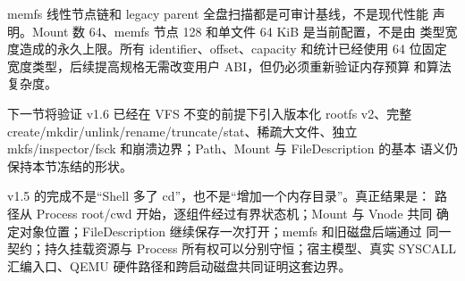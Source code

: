 memfs 线性节点链和 legacy parent 全盘扫描都是可审计基线，不是现代性能
声明。Mount 数 64、memfs 节点 128 和单文件 64 KiB 是当前配置，不是由
类型宽度造成的永久上限。所有 identifier、offset、capacity 和统计已经使用
64 位固定宽度类型，后续提高规格无需改变用户 ABI，但仍必须重新验证内存预算
和算法复杂度。

下一节将验证 v1.6 已经在 VFS 不变的前提下引入版本化 rootfs v2、完整
create/mkdir/unlink/rename/truncate/stat、稀疏大文件、独立
mkfs/inspector/fsck 和崩溃边界；Path、Mount 与 FileDescription 的基本
语义仍保持本节冻结的形状。

\begin{keyidea}
v1.5 的完成不是“Shell 多了 cd”，也不是“增加一个内存目录”。真正结果是：
路径从 Process root/cwd 开始，逐组件经过有界状态机；Mount 与 Vnode 共同
确定对象位置；FileDescription 继续保存一次打开；memfs 和旧磁盘后端通过
同一契约；持久挂载资源与 Process 所有权可以分别守恒；宿主模型、真实
SYSCALL 汇编入口、QEMU 硬件路径和跨启动磁盘共同证明这套边界。
\end{keyidea}
